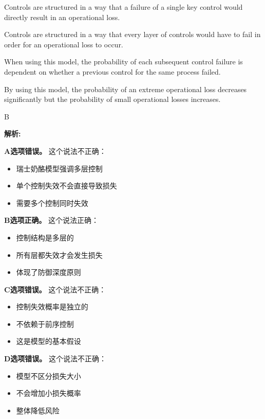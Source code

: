 \documentclass{article}
\newenvironment{explanation}
{\textbf{解析:}\par}
{\par}
\begin{document}
\begin{choices}
    \item Controls are structured in a way that a failure of a single key control would directly result in an operational loss.
    \item Controls are structured in a way that every layer of controls would have to fail in order for an operational loss to occur.
    \item When using this model, the probability of each subsequent control failure is dependent on whether a previous control for the same process failed.
    \item By using this model, the probability of an extreme operational loss decreases significantly but the probability of small operational losses increases.
\end{choices}

\begin{correctanswer}
    B
\end{correctanswer}

\begin{explanation}
    \textbf{A选项错误。}
    这个说法不正确：
    \begin{itemize}
        \item 瑞士奶酪模型强调多层控制
        \item 单个控制失效不会直接导致损失
        \item 需要多个控制同时失效
    \end{itemize}

    \textbf{B选项正确。}
    这个说法正确：
    \begin{itemize}
        \item 控制结构是多层的
        \item 所有层都失效才会发生损失
        \item 体现了防御深度原则
    \end{itemize}

    \textbf{C选项错误。}
    这个说法不正确：
    \begin{itemize}
        \item 控制失效概率是独立的
        \item 不依赖于前序控制
        \item 这是模型的基本假设
    \end{itemize}

    \textbf{D选项错误。}
    这个说法不正确：
    \begin{itemize}
        \item 模型不区分损失大小
        \item 不会增加小损失概率
        \item 整体降低风险
    \end{itemize}
\end{explanation}
\end{document}
